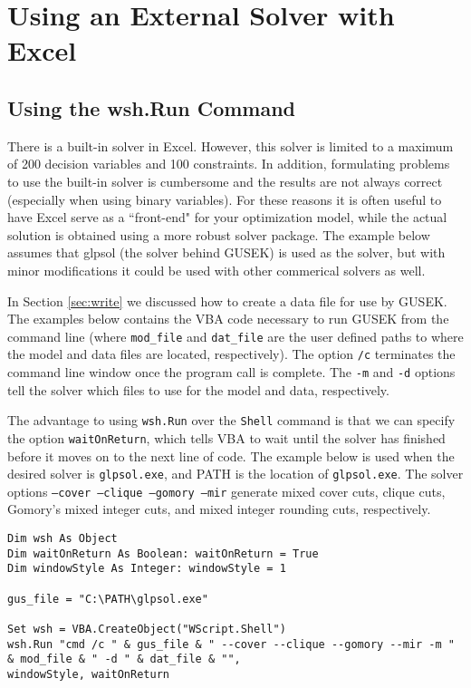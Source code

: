 \documentclass[10pt]{article}
\begin{document}
\section{Using an External Solver with Excel}
\label{sec:external}

\subsection{Using the wsh.Run Command}
\label{sec:shell}

There is a built-in solver in Excel.  However, this solver is limited to a maximum of 200 decision variables and 100 constraints.  In addition, formulating problems to use the built-in solver is cumbersome and the results are not always correct (especially when using binary variables).  For these reasons it is often useful to have Excel serve as a ``front-end" for your optimization model, while the actual solution is obtained using a more robust solver package.  The example below assumes that glpsol (the solver behind GUSEK) is used as the solver, but with minor modifications it could be used with other commerical solvers as well.  

In Section \ref{sec:write} we discussed how to create a data file for use by GUSEK.  The examples below contains the VBA code necessary to run GUSEK from the command line (where {\tt mod\_file} and {\tt dat\_file} are the user defined paths to where the model and data files are located, respectively).  The option {\tt /c} terminates the command line window once the program call is complete.  The {\tt -m} and {\tt -d} options tell the solver which files to use for the model and data, respectively.  

The advantage to using {\tt wsh.Run} over the {\tt Shell} command is that we can specify the option {\tt waitOnReturn}, which tells VBA to wait until the solver has finished before it moves on to the next line of code.  The example below is used when the desired solver is {\tt glpsol.exe}, and PATH is the location of {\tt glpsol.exe}.  The solver options {\tt --cover --clique --gomory --mir} generate mixed cover cuts, clique cuts, Gomory's mixed integer cuts, and mixed integer rounding cuts, respectively.  

\begin{verbatim}
Dim wsh As Object
Dim waitOnReturn As Boolean: waitOnReturn = True
Dim windowStyle As Integer: windowStyle = 1

gus_file = "C:\PATH\glpsol.exe"

Set wsh = VBA.CreateObject("WScript.Shell")
wsh.Run "cmd /c " & gus_file & " --cover --clique --gomory --mir -m " & mod_file & " -d " & dat_file & "",
windowStyle, waitOnReturn

\end{verbatim}
\end{document}
